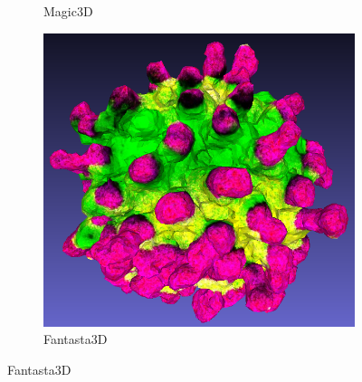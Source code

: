 \begin{figure}[ht]
\begin{subfigure}[b]{0.2\textwidth}
        \caption{Magic3D}
    \end{subfigure}
    \begin{subfigure}[b]{0.218\textwidth}
        \centering
        \includegraphics[width=\textwidth]{figures/technical/fantasia3d_ball_result.png}
        \caption{Fantasta3D}
    \end{subfigure}


\end{figure}
